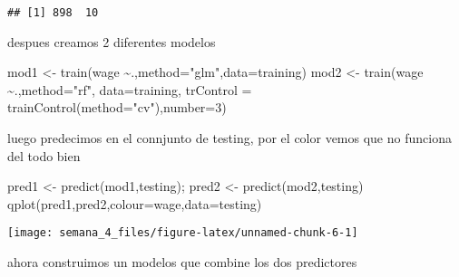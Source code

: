 \documentclass[
]{article}
\newenvironment{Shaded}{\begin{snugshade}}{\end{snugshade}}
\newcommand{\AttributeTok}[1]{\textcolor[rgb]{0.77,0.63,0.00}{#1}}
\newcommand{\DecValTok}[1]{\textcolor[rgb]{0.00,0.00,0.81}{#1}}
\newcommand{\FunctionTok}[1]{\textcolor[rgb]{0.00,0.00,0.00}{#1}}
\newcommand{\NormalTok}[1]{#1}
\newcommand{\OtherTok}[1]{\textcolor[rgb]{0.56,0.35,0.01}{#1}}
\newcommand{\SpecialCharTok}[1]{\textcolor[rgb]{0.00,0.00,0.00}{#1}}
\newcommand{\StringTok}[1]{\textcolor[rgb]{0.31,0.60,0.02}{#1}}
\begin{document}
\begin{verbatim}
## [1] 898  10
\end{verbatim}

despues creamos 2 diferentes modelos

\begin{Shaded}
\begin{Highlighting}[]
\NormalTok{mod1 }\OtherTok{\textless{}{-}} \FunctionTok{train}\NormalTok{(wage }\SpecialCharTok{\textasciitilde{}}\NormalTok{.,}\AttributeTok{method=}\StringTok{"glm"}\NormalTok{,}\AttributeTok{data=}\NormalTok{training)}
\NormalTok{mod2 }\OtherTok{\textless{}{-}} \FunctionTok{train}\NormalTok{(wage }\SpecialCharTok{\textasciitilde{}}\NormalTok{.,}\AttributeTok{method=}\StringTok{"rf"}\NormalTok{,}
              \AttributeTok{data=}\NormalTok{training, }
              \AttributeTok{trControl =} \FunctionTok{trainControl}\NormalTok{(}\AttributeTok{method=}\StringTok{"cv"}\NormalTok{),}\AttributeTok{number=}\DecValTok{3}\NormalTok{)}
\end{Highlighting}
\end{Shaded}

luego predecimos en el connjunto de testing, por el color vemos que no
funciona del todo bien

\begin{Shaded}
\begin{Highlighting}[]
\NormalTok{pred1 }\OtherTok{\textless{}{-}} \FunctionTok{predict}\NormalTok{(mod1,testing); pred2 }\OtherTok{\textless{}{-}} \FunctionTok{predict}\NormalTok{(mod2,testing)}
\FunctionTok{qplot}\NormalTok{(pred1,pred2,}\AttributeTok{colour=}\NormalTok{wage,}\AttributeTok{data=}\NormalTok{testing)}
\end{Highlighting}
\end{Shaded}

\begin{center}\texttt{[image: semana\_4\_files/figure-latex/unnamed-chunk-6-1]} \end{center}

ahora construimos un modelos que combine los dos predictores

\begin{Shaded}
\end{Shaded}
\end{document}
